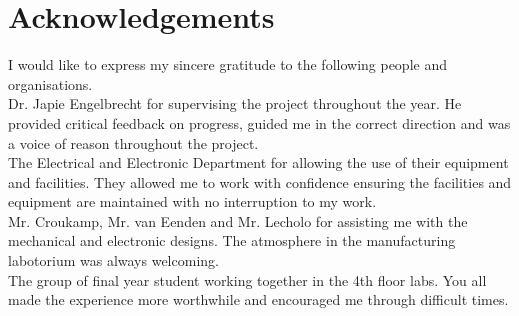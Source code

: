 \begin{abstract}[english]%
[JAPIE]This report presents the design, implementation, and testing of a feedback control system for a robotic gymnast. Feedback control systems were designed to swing up and balance an under-actuated robotic gymnast system. A physical system, consisting of mechanical and electronic hardware, was designed and constructed, and the feedback controllers were implemented in software. The feedback control system was verified both in simulation and on the physical system..
\end{abstract}


\begin{abstract}[afrikaans]%
In die projek word die swaaiende en balanseering beheerwette vir 'n robotiese gimnas genavors, ontwerp en getoets op 'n fisiese model. Die eletroniese, meganiese en sagteware ontwerpe word bespreek om ten einde te wys hoe die fisiese model, beheerders en so voort geimplementeer en getoets is.
\end{abstract}


\chapter{Acknowledgements}%

I would like to express my sincere gratitude to the following people
and organisations.\\

Dr. Japie Engelbrecht for supervising the project throughout the year. He provided critical feedback on progress, guided me in the correct direction and was a voice of reason throughout the project.\\

The Electrical and Electronic Department for allowing the use of their equipment and facilities. They allowed me to work with confidence ensuring the facilities and equipment are maintained with no interruption to my work.\\

Mr$.$ Croukamp, Mr$.$ van Eenden and Mr$.$ Lecholo for assisting me with the mechanical and electronic designs. The atmosphere in the manufacturing labotorium was always welcoming.\\

The group of final year student working together in the 4th floor labs. You all made the experience more worthwhile and encouraged me through  difficult times. 




